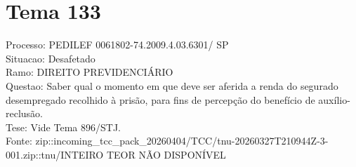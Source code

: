 \documentclass[12pt]{article}
\begin{document}
\section*{Tema 133}
Processo: PEDILEF 0061802-74.2009.4.03.6301/ SP\\
Situacao: Desafetado\\
Ramo: DIREITO PREVIDENCIÁRIO\\
Questao: Saber qual o momento em que deve ser aferida a renda do segurado desempregado recolhido à prisão, para fins de percepção do benefício de auxílio-reclusão.\\
Tese: Vide Tema 896/STJ.\\
Fonte: zip::incoming\_tcc\_pack\_20260404/TCC/tnu-20260327T210944Z-3-001.zip::tnu/INTEIRO TEOR NÃO DISPONÍVEL
\end{document}

